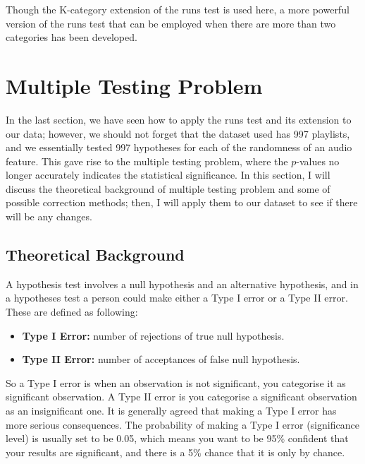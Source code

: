 \documentclass[12pt]{article}
\theoremstyle{plain}
\theoremstyle{definition}
\theoremstyle{remark}
\begin{document}
Though the K-category extension of the runs test is used here, a more powerful version\cite{3.4} of the runs test that can be employed when there are more than two categories has been developed. 





\newpage







\section{Multiple Testing Problem}
In the last section, we have seen how to apply the runs test and its extension to our data; however, we should not forget that the dataset used has 997 playlists, and we essentially tested 997 hypotheses for each of the randomness of an audio feature. This gave rise to the multiple testing problem, where the $p$-values no longer accurately indicates the statistical significance\cite{5.2}. In this section, I will discuss the theoretical background of multiple testing problem and some of possible correction methods; then, I will apply them to our dataset to see if there will be any changes.


\subsection{Theoretical Background}
A hypothesis test involves a null hypothesis and an alternative hypothesis, and in a hypotheses test a person could make either a Type I error or a Type II error. These are defined as following\cite{5.2}:
\begin{itemize}
    \item \textbf{Type I Error:} number of rejections of true null hypothesis.
    \item \textbf{Type II Error:} number of acceptances of false null hypothesis.
\end{itemize}
So a Type I error is when an observation is not significant, you categorise it as significant observation. A Type II error is you categorise a significant observation as an insignificant one. It is generally agreed that making a Type I error has more serious consequences.\cite{5.2} The probability of making a Type I error (significance level) is usually set to be 0.05, which means you want to be 95\% confident that your results are significant, and there is a 5\% chance that it is only by chance.\cite{5.4}
\end{document}
